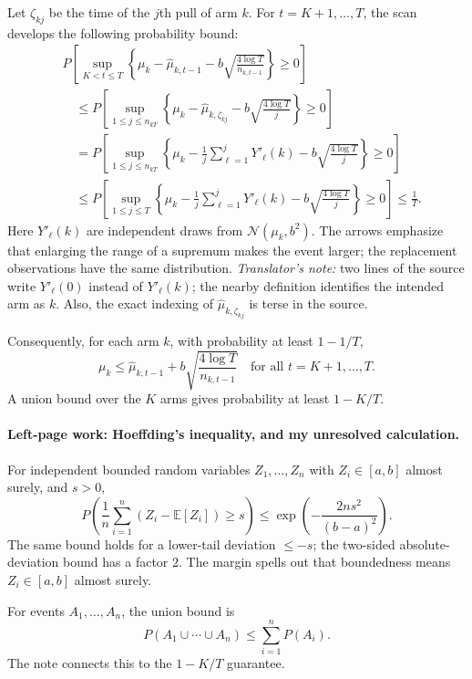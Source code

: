 Let $\zeta_{kj}$ be the time of the $j$th pull of arm $k$. For $t=K+1,\ldots,T$, the scan develops the following probability bound:
\begin{align*}
 &P\left[\sup_{K<t\le T}\left\{
 \mu_k-\widehat\mu_{k,t-1}
 -b\sqrt{\frac{4\log T}{n_{k,t-1}}}\right\}\ge0\right]\\
 &\quad\le P\left[\sup_{1\le j\le n_{kT}}\left\{
 \mu_k-\widehat\mu_{k,\zeta_{kj}}
 -b\sqrt{\frac{4\log T}{j}}\right\}\ge0\right]\\
 &\quad=P\left[\sup_{1\le j\le n_{kT}}\left\{
 \mu_k-\frac1j\sum_{\ell=1}^jY'_\ell(k)
 -b\sqrt{\frac{4\log T}{j}}\right\}\ge0\right]\\
 &\quad\le P\left[\sup_{1\le j\le T}\left\{
 \mu_k-\frac1j\sum_{\ell=1}^jY'_\ell(k)
 -b\sqrt{\frac{4\log T}{j}}\right\}\ge0\right]
 \le\frac1T.
\end{align*}
Here $Y'_\ell(k)$ are independent draws from $\mathcal N(\mu_k,b^2)$. The arrows emphasize that enlarging the range of a supremum makes the event larger; the replacement observations have the same distribution.
\textit{Translator's note:} two lines of the source write $Y'_\ell(0)$ instead of $Y'_\ell(k)$; the nearby definition identifies the intended arm as $k$. Also, the exact indexing of $\widehat\mu_{k,\zeta_{kj}}$ is terse in the source.

Consequently, for each arm $k$, with probability at least $1-1/T$,
\[
 \mu_k\le\widehat\mu_{k,t-1}
 +b\sqrt{\frac{4\log T}{n_{k,t-1}}}
 \quad\text{for all }t=K+1,\ldots,T.\tag{14.8}
\]
A union bound over the $K$ arms gives probability at least $1-K/T$.

\paragraph{Left-page work: Hoeffding's inequality, and my unresolved calculation.}
For independent bounded random variables $Z_1,\ldots,Z_n$ with $Z_i\in[a,b]$ almost surely, and $s>0$,
\[
 P\left(\frac1n\sum_{i=1}^n(Z_i-\mathbb E[Z_i])\ge s\right)
 \le\exp\left(-\frac{2ns^2}{(b-a)^2}\right).
\]
The same bound holds for a lower-tail deviation $\le-s$; the two-sided absolute-deviation bound has a factor $2$. The margin spells out that boundedness means $Z_i\in[a,b]$ almost surely.

For events $A_1,\ldots,A_n$, the union bound is
\[
 P(A_1\cup\cdots\cup A_n)\le\sum_{i=1}^nP(A_i).
\]
The note connects this to the $1-K/T$ guarantee.

